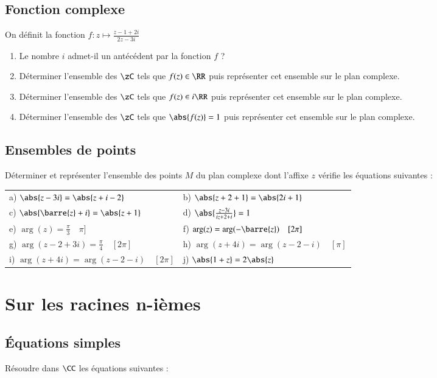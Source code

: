 \documentclass[oneside,12pt]{article}          %
\begin{document}
\subsection{Fonction complexe}
On définit la fonction $f:z\mapsto\frac{z-1+2i}{2z-3i}$
\begin{enumerate}
	\item Le nombre $i$ admet-il un antécédent par la fonction $f$ ?
	\item Déterminer l'ensemble des $\zC$ tels que $f(z)\in\RR$ puis représenter cet ensemble sur le plan complexe.
	\item Déterminer l'ensemble des $\zC$ tels que $f(z)\in i\RR$ puis représenter cet ensemble sur le plan complexe. 
	\item Déterminer l'ensemble des $\zC$ tels que $\abs{f(z)}=1$ puis représenter cet ensemble sur le plan complexe. 
\end{enumerate}




\subsection{Ensembles de points}
Déterminer et représenter l'ensemble des points $M$ du plan complexe dont l'affixe $z$ vérifie les équations suivantes :

\begin{tabular}{p{} p{}}
    a) $\abs{z-3i} = \abs{z+i-2} $ & b) $\abs{z+2+1}=\abs{2i+1} $ \\
    c) $\abs{\barre{z}+i}=\abs{z+1} $ & d) $\abs{\frac{z-3i}{iz+2+i}} = 1$ \\
    e) $\arg(z)=\frac{\pi}{3} \quad\pi]$ & f) $\arg(z)=\arg(-\barre{z}) \quad[2\pi]$ \\
    g) $\arg(z-2+3i)=\frac{\pi}{4} \quad[2\pi]$ & h) $\arg(z+4i)=\arg(z-2-i) \quad[\pi]$ \\
    i) $\arg(z+4i)=\arg(z-2-i)\quad [2\pi]$ & j) $\abs{1+z}=2\abs{z}$ \\     
\end{tabular}



\section{Sur les racines n-ièmes}

\subsection{Équations simples}
Résoudre dans $\CC$ les équations suivantes :
\end{document}
